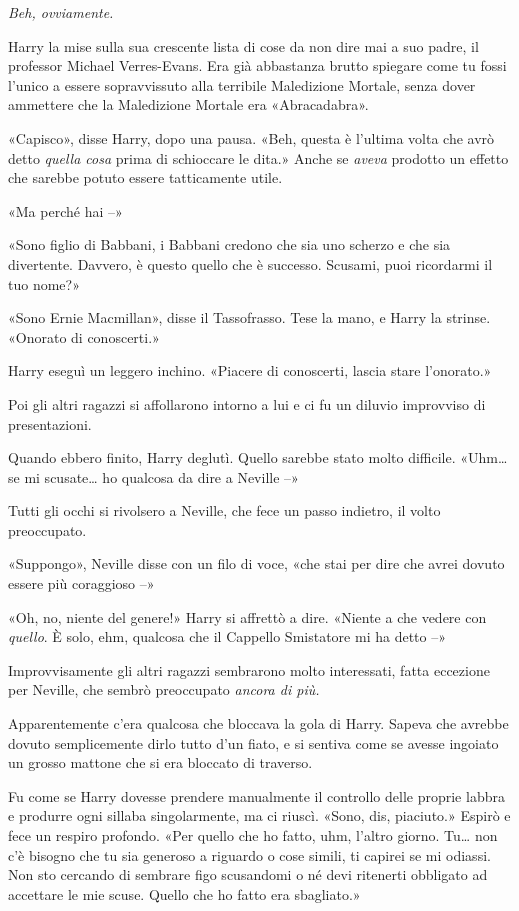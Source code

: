 \textit{Beh, ovviamente.}

Harry la mise sulla sua crescente lista di cose da non dire mai a suo padre, il professor Michael Verres-Evans. Era già abbastanza brutto spiegare come tu fossi l’unico a essere sopravvissuto alla terribile Maledizione Mortale, senza dover ammettere che la Maledizione Mortale era «Abracadabra».

«Capisco», disse Harry, dopo una pausa. «Beh, questa è l’ultima volta che avrò detto \textit{quella cosa} prima di schioccare le dita.» Anche se \textit{aveva} prodotto un effetto che sarebbe potuto essere tatticamente utile.

«Ma perché hai –»

«Sono figlio di Babbani, i Babbani credono che sia uno scherzo e che sia divertente. Davvero, è questo quello che è successo. Scusami, puoi ricordarmi il tuo nome?»

«Sono Ernie Macmillan», disse il Tassofrasso. Tese la mano, e Harry la strinse. «Onorato di conoscerti.»

Harry eseguì un leggero inchino. «Piacere di conoscerti, lascia stare l’onorato.»

Poi gli altri ragazzi si affollarono intorno a lui e ci fu un diluvio improvviso di presentazioni.

Quando ebbero finito, Harry deglutì. Quello sarebbe stato molto difficile. «Uhm… se mi scusate… ho qualcosa da dire a Neville –»

Tutti gli occhi si rivolsero a Neville, che fece un passo indietro, il volto preoccupato.

«Suppongo», Neville disse con un filo di voce, «che stai per dire che avrei dovuto essere più coraggioso –»

«Oh, no, niente del genere!» Harry si affrettò a dire. «Niente a che vedere con \textit{quello}. È solo, ehm, qualcosa che il Cappello Smistatore mi ha detto –»

Improvvisamente gli altri ragazzi sembrarono molto interessati, fatta eccezione per Neville, che sembrò preoccupato \textit{ancora di più.}

Apparentemente c’era qualcosa che bloccava la gola di Harry. Sapeva che avrebbe dovuto semplicemente dirlo tutto d’un fiato, e si sentiva come se avesse ingoiato un grosso mattone che si era bloccato di traverso.

Fu come se Harry dovesse prendere manualmente il controllo delle proprie labbra e produrre ogni sillaba singolarmente, ma ci riuscì. «Sono, dis, piaciuto.» Espirò e fece un respiro profondo. «Per quello che ho fatto, uhm, l’altro giorno. Tu… non c’è bisogno che tu sia generoso a riguardo o cose simili, ti capirei se mi odiassi. Non sto cercando di sembrare figo scusandomi o né devi ritenerti obbligato ad accettare le mie scuse. Quello che ho fatto era sbagliato.»

